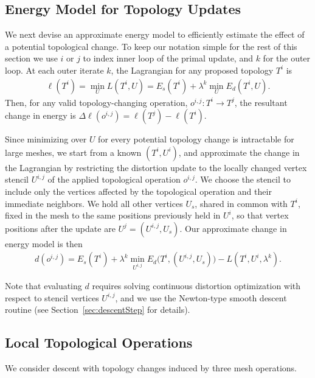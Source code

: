 \subsection{Energy Model for Topology Updates}
\label{sec:topology_energy}
We next devise an approximate energy model to efficiently estimate the effect of a potential topological change. 
To keep our notation simple for the rest of this section we use $i$ or $j$ to index inner loop of the primal update, and $k$ for the outer loop.
At each outer iterate $k$, the Lagrangian for any proposed topology $T^i$ is  
\begin{align}
\ell(T^i) = \min_{U} L(T^i, U) = E_s(T^i) + \lambda^k \min_{U} E_d(T^i, U).
\end{align}
Then, for any valid topology-changing operation, $o^{i,j}:T^i \rightarrow T^j$, the resultant change in energy is $\Delta \ell(o^{i,j}) = \ell(T^j) - \ell(T^i)$.


Since minimizing over $U$ for every potential topology change is intractable for large meshes, we start from a known $(T^i, U^i)$, and approximate the change in the Lagrangian by restricting the distortion update to the locally changed vertex stencil $U^{i,j}$ of the applied topological operation $o^{i,j}$. We choose the stencil to include only the vertices affected by the topological operation and their immediate neighbors.
We hold all other vertices $U_s$, shared in common with $T^i$, fixed in the mesh
to the same positions previously held in $U^i$, so that vertex positions after the update are $U^j = (U^{i,j}, U_s)$.  Our approximate change in energy model is then 
\begin{align} 
d(o^{i,j}) = E_s(T^i) + \lambda^k \min_{U^{i,j}} E_d \big( T^i, (U^{i,j}, U_s) \big) - L(T^i,U^i,\lambda^k).
\end{align}

Note that evaluating $d$ requires solving continuous distortion optimization with respect to stencil vertices $U^{i,j}$, and we use the Newton-type smooth descent routine (see Section~\ref{sec:descentStep} for details).

\subsection{Local Topological Operations}
\label{sec:topology_ops}

We consider descent with topology changes induced by three mesh operations.

